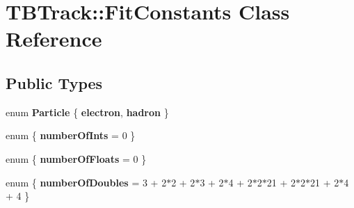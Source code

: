 \section{TBTrack::FitConstants Class Reference}
\label{classTBTrack_1_1FitConstants}
\subsection*{Public Types}
\begin{DoxyCompactItemize}
\item 
enum {\bfseries Particle} \{ {\bfseries electron}, 
{\bfseries hadron}
 \}
\item 
enum \{ {\bfseries numberOfInts} = 0
 \}
\item 
enum \{ {\bfseries numberOfFloats} = 0
 \}
\item 
enum \{ {\bfseries numberOfDoubles} = 3 + 2$\ast$2 + 2$\ast$3 + 2$\ast$4 + 2$\ast$2$\ast$21 + 2$\ast$2$\ast$21 + 2$\ast$4 + 4
 \}
\end{DoxyCompactItemize}
